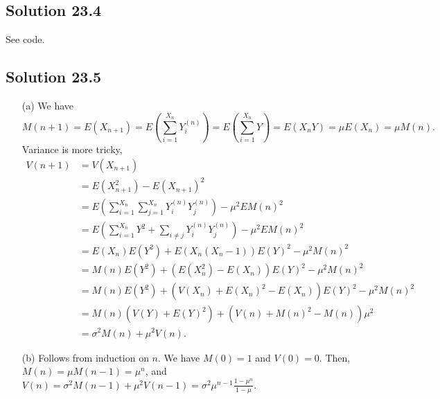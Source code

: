 \subsection*{Solution 23.4}

See code.


\subsection*{Solution 23.5}

\begin{itemize}
    \item[(a)] We have
        \begin{equation*}
            M(n + 1) = E(X_{n + 1})
                = E\left(\sum_{i = 1}^{X_n} Y_i^{(n)}\right)
                = E\left(\sum_{i = 1}^{X_n} Y\right)
                = E(X_n Y)
                = \mu E(X_n)
                = \mu M(n).
        \end{equation*}
        Variance is more tricky,
        \begin{equation*}
            \begin{split}
                V(n + 1)
                    &= V(X_{n + 1}) \\
                    &= E(X_{n + 1}^2) - E(X_{n + 1})^2 \\
                    &= E\left(\sum_{i = 1}^{X_n} \sum_{j = 1}^{X_n} Y_i^{(n)} Y_j^{(n)}\right) - \mu^2 E M(n)^2 \\
                    &= E\left(\sum_{i = 1}^{X_n} Y^2 +  \sum_{i \neq j} Y_i^{(n)} Y_j^{(n)}\right) - \mu^2 E M(n)^2 \\
                    &= E(X_n) E(Y^2) + E(X_n (X_n - 1)) E(Y)^2 - \mu^2 M(n)^2 \\
                    &= M(n) E(Y^2) + (E(X_n^2) - E(X_n)) E(Y)^2 - \mu^2 M(n)^2 \\
                    &= M(n) E(Y^2) + (V(X_n) + E(X_n)^2 - E(X_n)) E(Y)^2 - \mu^2 M(n)^2 \\
                    &= M(n) (V(Y) + E(Y)^2) + (V(n) + M(n)^2 - M(n)) \mu^2 \\
                    &= \sigma^2 M(n) + \mu^2 V(n).
            \end{split}
        \end{equation*}
    \item[(b)] Follows from induction on $n$.
        We have $M(0) = 1$ and $V(0) = 0$.
        Then, $M(n) = \mu M(n - 1) = \mu^n$, and $V(n) = \sigma^2 M(n - 1) + \mu^2 V(n - 1) = \sigma^2 \mu^{n - 1} \frac{1 - \mu^n}{1 - \mu}$.

\end{itemize}

